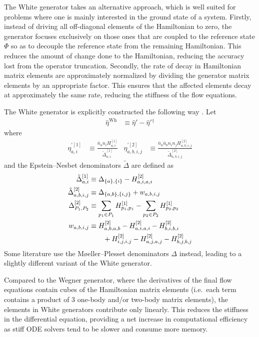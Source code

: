 The White generator takes an alternative approach, which is well suited for problems where one is mainly interested in the ground state of a system.  Firstly, instead of driving all off-diagonal elements of the Hamiltonian to zero, the generator focuses exclusively on those ones that are coupled to the reference state $\Phi$ so as to decouple the reference state from the remaining Hamiltonian.  This reduces the amount of change done to the Hamiltonian, reducing the accuracy lost from the operator truncation.  Secondly, the rate of decay in Hamiltonian matrix elements are approximately normalized by dividing the generator matrix elements by an appropriate factor.  This ensures that the affected elements decay at approximately the same rate, reducing the stiffness of the flow equations.

The White generator is explicitly constructed the following way \cite{PhysRevLett.106.222502,White:cond-mat0201346}.  Let
\begin{align*}
\hat{\eta}^{\text{Wh}} &\equiv \hat{\eta}' - \hat{\eta}'{}^\dagger
\end{align*}
where
\begin{align*}
\eta^{\prime [1]}_{a, i} &\equiv \frac{\bar{n}_a n_i H^{[1]}_{a, i}}{\tilde{\Delta}^{[1]}_{a, i}} &
\eta^{\prime [2]}_{a, b, i, j} &\equiv \frac{\bar{n}_a \bar{n}_b n_i n_j H^{[2]}_{a, b, i, j}}{\tilde{\Delta}^{[2]}_{a, b, i, j}}
\end{align*}
and the Epstein--Nesbet denominators $\tilde{\Delta}$ are defined as
\begin{align}
\tilde{\Delta}^{[1]}_{a, i} &\equiv \Delta_{\{a\}, \{i\}} - H^{[2]}_{a, i, a, i} \notag \\
\tilde{\Delta}^{[2]}_{a, b, i, j} &\equiv \Delta_{\{a, b\}, \{i, j\}} + w_{a, b, i, j} \notag \\
\Delta^{[2]}_{P_1, P_2} &\equiv \sum_{p_1 \in P_1} H^{[1]}_{p_1, p_1} - \sum_{p_2 \in P_2} H^{[1]}_{p_2, p_2} \label{eq:moellerplessetdenominator} \\
w_{a, b, i, j}
  &\equiv H^{[2]}_{a, b, a, b} - H^{[2]}_{a, i, a, i} - H^{[2]}_{b, i, b, i} \notag \\
  &\qquad + H^{[2]}_{i, j, i, j} - H^{[2]}_{a, j, a, j} - H^{[2]}_{b, j, b, j} \notag
\end{align}
Some literature use the M\o eller--Plesset denominators $\Delta$ instead, leading to a slightly different variant of the White generator.

Compared to the Wegner generator, where the derivatives of the final flow equations contain cubes of the Hamiltonian matrix elements (i.e.\ each term contains a product of 3 one-body and/or two-body matrix elements), the elements in White generators contribute only linearly.  This reduces the stiffness in the differential equation, providing a net increase in computational efficiency as stiff ODE solvers tend to be slower and consume more memory.

